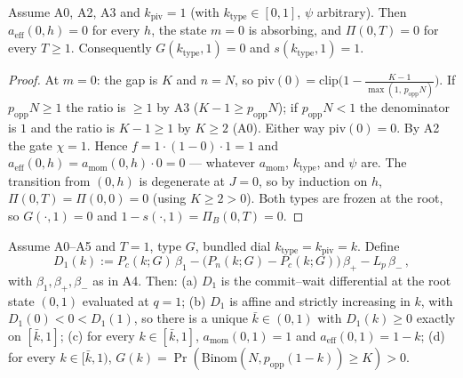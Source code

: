 \begin{lemma}\label{lem:freeze}
Assume A0, A2, A3 and $k_{\mathrm{piv}}=1$ (with $k_{\mathrm{type}}\in[0,1]$, $\psi$
arbitrary). Then $a_{\mathrm{eff}}(0,h)=0$ for every $h$, the state $m=0$ is absorbing, and
$\Pi(0,T)=0$ for every $T\ge 1$. Consequently $G(k_{\mathrm{type}},1)=0$ and
$s(k_{\mathrm{type}},1)=1$.
\end{lemma}

\begin{proof}
At $m=0$: the gap is $K$ and $n=N$, so
$\mathrm{piv}(0)=\mathrm{clip}\big(1-\frac{K-1}{\max(1,\,p_{\mathrm{opp}}N)}\big)$. If
$p_{\mathrm{opp}}N\ge 1$ the ratio is $\ge 1$ by A3 ($K-1\ge p_{\mathrm{opp}}N$); if
$p_{\mathrm{opp}}N<1$ the denominator is $1$ and the ratio is $K-1\ge 1$ by $K\ge 2$ (A0).
Either way $\mathrm{piv}(0)=0$. By A2 the gate $\chi=1$. Hence $f=1\cdot(1-0)\cdot 1=1$ and
$a_{\mathrm{eff}}(0,h)=a_{\mathrm{mom}}(0,h)\cdot 0=0$ --- whatever $a_{\mathrm{mom}}$,
$k_{\mathrm{type}}$, and $\psi$ are. The transition from $(0,h)$ is degenerate at $J=0$, so by
induction on $h$, $\Pi(0,T)=\Pi(0,0)=0$ (using $K\ge 2>0$). Both types are frozen at the root,
so $G(\cdot,1)=0$ and $1-s(\cdot,1)=\Pi_B(0,T)=0$.
\end{proof}

\begin{lemma}[interior ignition at $T=1$]\label{lem:ignition}
Assume A0--A5 and $T=1$, type $G$, bundled dial $k_{\mathrm{type}}=k_{\mathrm{piv}}=k$. Define
\[
D_1(k):=P_c(k;G)\,\beta_1-\big(P_n(k;G)-P_c(k;G)\big)\,\beta_+-L_p\,\beta_-\,,
\]
with $\beta_1,\beta_+,\beta_-$ as in A4. Then: (a) $D_1$ is the commit--wait differential at
the root state $(0,1)$ evaluated at $q=1$; (b) $D_1$ is affine and strictly increasing in $k$,
with $D_1(0)<0<D_1(1)$, so there is a unique $\bar k\in(0,1)$ with $D_1(k)\ge 0$ exactly on
$[\bar k,1]$; (c) for every $k\in[\bar k,1]$, $a_{\mathrm{mom}}(0,1)=1$ and
$a_{\mathrm{eff}}(0,1)=1-k$; (d) for every $k\in[\bar k,1)$,
$G(k)=\Pr(\mathrm{Binom}(N,p_{\mathrm{opp}}(1-k))\ge K)>0$.
\end{lemma}

